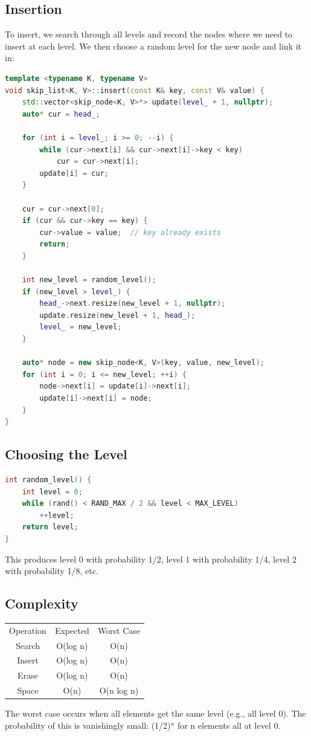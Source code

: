 \subsection{Insertion}

To insert, we search through all levels and record the nodes where we need to insert at each level. We then choose a random level for the new node and link it in:

\begin{lstlisting}[language=C++]
template <typename K, typename V>
void skip_list<K, V>::insert(const K& key, const V& value) {
    std::vector<skip_node<K, V>*> update(level_ + 1, nullptr);
    auto* cur = head_;

    for (int i = level_; i >= 0; --i) {
        while (cur->next[i] && cur->next[i]->key < key)
            cur = cur->next[i];
        update[i] = cur;
    }

    cur = cur->next[0];
    if (cur && cur->key == key) {
        cur->value = value;  // key already exists
        return;
    }

    int new_level = random_level();
    if (new_level > level_) {
        head_->next.resize(new_level + 1, nullptr);
        update.resize(new_level + 1, head_);
        level_ = new_level;
    }

    auto* node = new skip_node<K, V>(key, value, new_level);
    for (int i = 0; i <= new_level; ++i) {
        node->next[i] = update[i]->next[i];
        update[i]->next[i] = node;
    }
}
\end{lstlisting}

\subsection{Choosing the Level}

\begin{lstlisting}[language=C++]
int random_level() {
    int level = 0;
    while (rand() < RAND_MAX / 2 && level < MAX_LEVEL)
        ++level;
    return level;
}
\end{lstlisting}

This produces level 0 with probability 1/2, level 1 with probability 1/4, level 2 with probability 1/8, etc.

\subsection{Complexity}

\begin{center}
\begin{tabular}{ccc}
\toprule
Operation & Expected & Worst Case \\
Search & O(log n) & O(n) \\
Insert & O(log n) & O(n) \\
Erase & O(log n) & O(n) \\
Space & O(n) & O(n log n) \\

\bottomrule
\end{tabular}
\end{center}
The worst case occurs when all elements get the same level (e.g., all level 0). The probability of this is vanishingly small: (1/2)$^{n}$ for n elements all at level 0.

